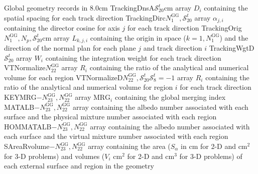 \begin{DescriptionEnregistrement}{Global geometry records in }{8.0cm}\label{tabl:NXTGlobal}
\DbleEnr
  {TrackingDnsA}{$\mathcal{S}^{t}_{20}$}{cm}
  {array $D_{i}$ containing the spatial spacing for each track direction}
\DbleEnr
  {TrackingDirc}{$N^{\text{GG}}_{1},\mathcal{S}^{t}_{20}$}{}
  {array $\alpha_{j,i}$ containing the director cosine for axis $j$ for each track direction}
\DbleEnr
  {TrackingOrig}{$N^{\text{GG}}_{1},N_{p},\mathcal{S}^{t}_{20}$}{cm}
  {array $L_{k,j,i}$ containing the origin in space ($k=1,N^{\text{GG}}_{1}$) and the direction of the normal plan for each plane $j$ and track direction $i$}
\DbleEnr
  {TrackingWgtD}{$\mathcal{S}^{t}_{20}$}{}
  {array $W_{i}$ containing the integration weight for each track direction}
\DbleEnr
  {VTNormalize}{$N^{\text{GG}}_{22}$}{}
  {array $R_{i}$ containing the ratio of the analytical and numerical volume for each region}
\OptDbleEnr
  {VTNormalizeD}{$N^{\text{GG}}_{22},\mathcal{S}^{t}_{20}$}{$\mathcal{S}^{t}_{8}=-1$}{}
  {array $R_{i}$ containing the ratio of the analytical and numerical volume for region $i$ for each track direction}
\IntEnr
  {KEYMRG}{$-N^{\text{GG}}_{23},N^{\text{GG}}_{22}$}
  {array $\text{MRG}_{i}$ containing the global merging index}
\IntEnr
  {MATALB}{$-N^{\text{GG}}_{23},N^{\text{GG}}_{22}$}
  {array containing the albedo number associated with each surface and the physical mixture number associated with each region}
\IntEnr
  {HOMMATALB}{$-N^{\text{GG}}_{23},N^{\text{GG}}_{22}$}
  {array containing the albedo number associated with each surface and the virtual mixture number associated with each region}
\DbleEnr
  {SAreaRvolume}{$-N^{\text{GG}}_{23},N^{\text{GG}}_{22}$}{}
  {array containing the area ($S_{\alpha}$ in cm for 2-D and cm$^{2}$ for 3-D problems) and volumes ($V_{i}$ cm$^{2}$ for 2-D and
cm$^{3}$ for 3-D problems) of each external surface and region in the geometry}
\end{DescriptionEnregistrement}

\clearpage
